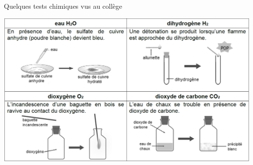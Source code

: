 \begin{doc}{Quelques tests chimiques vus au collège}
    \begin{center}
        \includegraphics[scale=0.46]{Images/Tests_chimiques.png}
    \end{center}
\end{doc}


